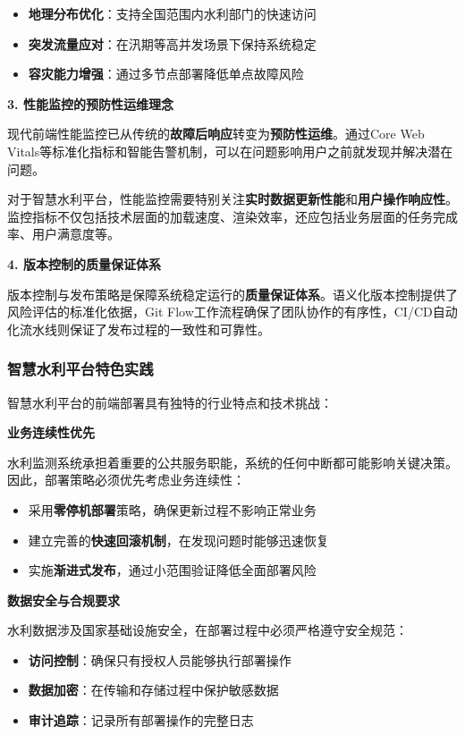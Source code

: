 \begin{itemize}
\tightlist
\item
  \textbf{地理分布优化}：支持全国范围内水利部门的快速访问
\item
  \textbf{突发流量应对}：在汛期等高并发场景下保持系统稳定
\item
  \textbf{容灾能力增强}：通过多节点部署降低单点故障风险
\end{itemize}

\textbf{3. 性能监控的预防性运维理念}

现代前端性能监控已从传统的\textbf{故障后响应}转变为\textbf{预防性运维}。通过Core Web Vitals等标准化指标和智能告警机制，可以在问题影响用户之前就发现并解决潜在问题。

对于智慧水利平台，性能监控需要特别关注\textbf{实时数据更新性能}和\textbf{用户操作响应性}。监控指标不仅包括技术层面的加载速度、渲染效率，还应包括业务层面的任务完成率、用户满意度等。

\textbf{4. 版本控制的质量保证体系}

版本控制与发布策略是保障系统稳定运行的\textbf{质量保证体系}。语义化版本控制提供了风险评估的标准化依据，Git Flow工作流程确保了团队协作的有序性，CI/CD自动化流水线则保证了发布过程的一致性和可靠性。

\subsubsection{智慧水利平台特色实践}\label{ux667aux6167ux6c34ux5229ux5e73ux53f0ux7279ux8272ux5b9eux8df5}

智慧水利平台的前端部署具有独特的行业特点和技术挑战：

\textbf{业务连续性优先}

水利监测系统承担着重要的公共服务职能，系统的任何中断都可能影响关键决策。因此，部署策略必须优先考虑业务连续性：

\begin{itemize}
\tightlist
\item
  采用\textbf{零停机部署}策略，确保更新过程不影响正常业务
\item
  建立完善的\textbf{快速回滚机制}，在发现问题时能够迅速恢复
\item
  实施\textbf{渐进式发布}，通过小范围验证降低全面部署风险
\end{itemize}

\textbf{数据安全与合规要求}

水利数据涉及国家基础设施安全，在部署过程中必须严格遵守安全规范：

\begin{itemize}
\tightlist
\item
  \textbf{访问控制}：确保只有授权人员能够执行部署操作
\item
  \textbf{数据加密}：在传输和存储过程中保护敏感数据
\item
  \textbf{审计追踪}：记录所有部署操作的完整日志
\end{itemize}

